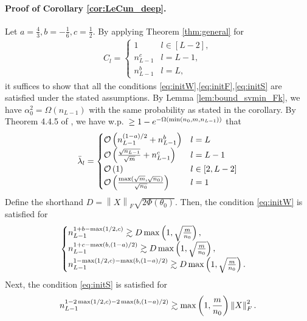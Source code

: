 \documentclass{article}
\newenvironment{proof}{\par\noindent{\bf Proof:\ }}{\hfill$\Box$\\[2mm]}
\newcommand{\bigO}[1]{\mathcal{O}\left(#1\right)}
\newcommand{\bigOmg}[1]{\Omega\left(#1\right)}
\newcommand{\norm}[1]{\left\|#1\right\|}
\def\min{\mathop{\rm min}\nolimits}
\def\max{\mathop{\rm max}\nolimits}
\begin{document}
\paragraph{Proof of Corollary \ref{cor:LeCun_deep}.}
    Let $a=\frac{4}{3},b=-\frac{1}{6},c=\frac{1}{2}.$
    By applying Theorem \ref{thm:general} for
    \begin{align*}
	C_l=
	\begin{cases}
	    1 & l\in[L-2],\\
	    n_{L-1}^{c} & l=L-1, \\
	    n_{L-1}^{b} & l= L,
	\end{cases}
    \end{align*}
    it suffices to show that all the conditions \eqref{eq:initW},\eqref{eq:initF},\eqref{eq:initS} are satisfied
    under the stated assumptions. 
    By Lemma \ref{lem:bound_svmin_Fk}, we have $\alpha_0^2 = \bigOmg{n_{L-1}}$ with the same probability as stated in the corollary.
    By Theorem 4.4.5 of \cite{vershynin2018high}, we have w.p.\ $\geq 1-e^{-\Omega(\min(n_0,m,n_{L-1}))}$ that
    \begin{align*}
	\bar{\lambda}_l 
	= 
	\begin{cases}
	    \bigO{n_{L-1}^{(1-a)/2} + n_{L-1}^b} & l=L\\
	    \bigO{\frac{\sqrt{n_{L-1}}}{\sqrt{m}} +  n_{L-1}^c} & l=L-1\\
	    \bigO{1} & l\in[2,L-2]\\
	    \bigO{\frac{\max(\sqrt{m},\sqrt{n_0})}{\sqrt{n_0}}} & l=1
	\end{cases}
    \end{align*}
    Define the shorthand $D=\norm{X}_F\sqrt{2\Phi(\theta_0)} .$
    Then, the condition \eqref{eq:initW} is satisfied for 
    \begin{align*}
	\begin{cases}
	    n_{L-1}^{1+b-\max(1/2,c)} \gtrsim D \max\left(1,\sqrt{\frac{m}{n_0}}\right),\\
	    n_{L-1}^{1+c-\max(b,(1-a)/2)} \gtrsim D \max\left(1,\sqrt{\frac{m}{n_0}}\right),\\
	    n_{L-1}^{1-\max(1/2,c)-\max(b,(1-a)/2)} \gtrsim D \max\left(1,\sqrt{\frac{m}{n_0}}\right) .
	\end{cases}
    \end{align*}
    Next, the condition \eqref{eq:initS} is satisfied for
    \begin{align*}
	n_{L-1}^{1-2\max(1/2,c)-2\max(b,(1-a)/2)} \gtrsim \max\left(1,\frac{m}{n_0}\right) \norm{X}_F^2 .
    \end{align*}
\end{document}
